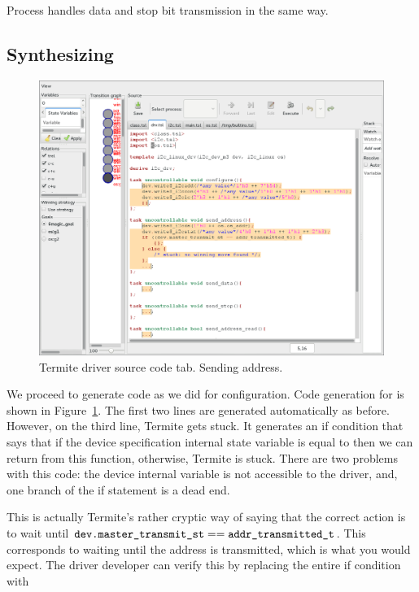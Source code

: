 Process  handles data and stop bit transmission in the same way.

\subsection{Synthesizing}

\begin{figure}
    \center
    \includegraphics[width=\linewidth]{imgs/screenshot_3.png}
    \caption{Termite driver source code tab. Sending address.}
    \label{fig:driver_tab_addr}
\end{figure}

We proceed to generate code as we did for configuration. Code generation for  is shown in Figure~\ref{fig:driver_tab_addr}. The first two lines are generated automatically as before. However, on the third line, Termite gets stuck. It generates an if condition that says that if the device specification internal state variable  is equal to  then we can return from this function, otherwise, Termite is stuck. There are two problems with this code: the device internal variable is not accessible to the driver, and, one branch of the if statement is a dead end. 

This is actually Termite's rather cryptic way of saying that the correct action is to wait until $\texttt{dev.master\_transmit\_st} == \texttt{addr\_transmitted\_t}$. This corresponds to waiting until the address is transmitted, which is what you would expect. The driver developer can verify this by replacing the entire if condition with 

